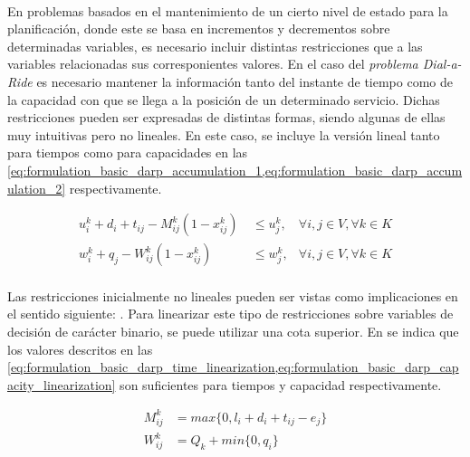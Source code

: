 \documentclass{subfiles}
\begin{document}
        \paragraph{}
        En problemas basados en el mantenimiento de un cierto nivel de estado para la planificación, donde este se basa en incrementos y decrementos sobre determinadas variables, es necesario incluir distintas restricciones que  a las variables relacionadas sus corresponientes valores. En el caso del \emph{problema Dial-a-Ride} es necesario mantener la información tanto del instante de tiempo como de la capacidad con que se llega a la posición de un determinado servicio. Dichas restricciones pueden ser expresadas de distintas formas, siendo algunas de ellas muy intuitivas pero no lineales. En este caso, se incluye la versión lineal tanto para tiempos como para capacidades en las \cref{eq:formulation_basic_darp_accumulation_1,eq:formulation_basic_darp_accumulation_2} respectivamente.

        \begin{align}
        \label{eq:formulation_basic_darp_accumulation_1}
          u_{i}^{k} + d_{i} + t_{ij} - M_{ij}^k (1 - x_{ij}^k) \ &\leq u_{j}^{k}, & \forall i,j \in V, \forall k \in K \\
        \label{eq:formulation_basic_darp_accumulation_2}
          w_{i}^{k} + q_{j} - W_{ij}^k (1 - x_{ij}^k) \ &\leq w_{j}^{k}, & \forall i,j \in V, \forall k \in K
        \end{align}

        \paragraph{}
        Las restricciones inicialmente no lineales pueden ser vistas como implicaciones en el sentido siguiente: . Para linearizar este tipo de restricciones sobre variables de decisión de carácter binario, se puede utilizar una cota superior. En \cite{cordeau2006branch} se indica que los valores descritos en las \cref{eq:formulation_basic_darp_time_linearization,eq:formulation_basic_darp_capacity_linearization} son suficientes para tiempos y capacidad respectivamente.

        \begin{align}
        \label{eq:formulation_basic_darp_time_linearization}
          M_{ij}^k &= max\{0, l_{i} + d_{i} + t_{ij} - e_{j}\} \\
        \label{eq:formulation_basic_darp_capacity_linearization}
          W_{ij}^k &= Q_{k} + min\{0, q_{i}\}
        \end{align}
\end{document}
